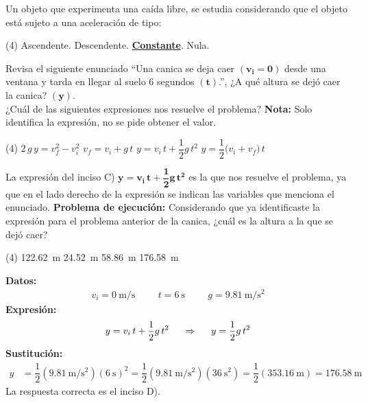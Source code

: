 \documentclass[12pt, letter]{exam}
\begin{document}
\begin{questions}
    \question Un objeto que experimenta una caída libre, se estudia considerando que el objeto está sujeto a una aceleración de tipo:
    \begin{tasks}(4)
        \task Ascendente.
        \task Descendente.
        \task \underline{\textbf{Constante}}.
        \task Nula.
    \end{tasks}
    \question Revisa el siguiente enunciado \enquote{Una canica se deja caer $\mathbf{(v_{i} = 0)}$ desde una ventana y tarda en llegar al suelo \num{6} segundos $\mathbf{(t)}$.}, ¿A qué altura se dejó caer la canica? $\mathbf{(y)}$. 
    \\
    ¿Cuál de las siguientes expresiones nos resuelve el problema? \textbf{Nota: } Solo identifica la expresión, no se pide obtener el valor.
    \begin{tasks}(4)
        \task $2 \, g \, y = v_{f}^{2} - v_{i}^{2}$
        \task $v_{f} = v_{i} + g \, t$
        \task $y = v_{i} \, t + \dfrac{1}{2} g \, t^{2}$
        \task $y = \dfrac{1}{2} \big( v_{i} + v_{f} \big) \, t$
    \end{tasks}
    La expresión del inciso C) $\mathbf{y = v_{i} \, t + \dfrac{1}{2} g \, t^{2}}$ es la que nos resuelve el problema, ya que en el lado derecho de la expresión se indican las variables que menciona el enunciado.
    \question \label{Problema_02} \textbf{Problema de ejecución:} Considerando que ya identificaste la expresión para el problema anterior de la canica, ¿cuál es la altura a la que se dejó caer?
    \begin{tasks}(4)
        \task \SI{122.62}{\meter}
        \task \SI{24.52}{\meter}
        \task \SI{58.86}{\meter}
        \task \SI{176.58}{\meter}
    \end{tasks}
    \textbf{Datos:}
    \begin{align*}
    v_{i} = \SI{0}{\meter\per\second} \hspace{1cm} t = \SI{6}{\second} \hspace{1cm} g = \SI{9.81}{\meter\per\square\second}
    \end{align*}
    \textbf{Expresión:}
    \begin{align*}
    y = v_{i} \, t + \dfrac{1}{2} g \, t^{2} \hspace{0.5cm} \Rightarrow \hspace{0.5cm} y = \dfrac{1}{2} g \, t^{2}
    \end{align*}
    \textbf{Sustitución:}
    \begin{align*}
    y &= \dfrac{1}{2} \left( \SI{9.81}{\meter\per\square\second} \right) \left( \SI{6}{\second} \right)^{2} =  \dfrac{1}{2} \left( \SI{9.81}{\meter\per\square\second} \right) \left( \SI{36}{\square\second} \right) = \dfrac{1}{2} \left( \SI{353.16}{\meter} \right) = \SI{176.58}{\meter}
    \end{align*}
    La respuesta correcta es el inciso D).
    

\end{questions}
\end{document}
